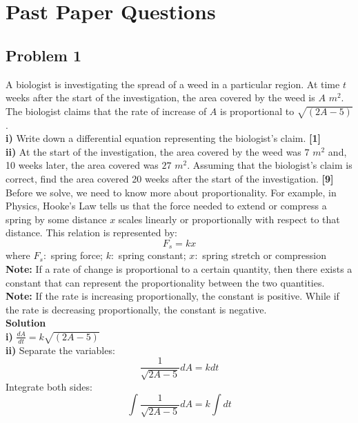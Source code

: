 \documentclass[hidelinks, a4paper, 12pt]{article}
\begin{document}
    \section{Past Paper Questions}
        \subsection{Problem 1}
            A biologist is investigating the spread of a weed in a particular region. At time $t$ weeks after the start of
            the investigation, the area covered by the weed is $A$ $m^2$. The biologist claims that the rate of increase of $A$
            is proportional to $\sqrt{(2A-5)}$.\\[\baselineskip]
            \textbf{i)} Write down a differential equation representing the biologist's claim. \textbf{[1]}\\[\baselineskip]
            \textbf{ii)} At the start of the investigation, the area covered by the weed was $7$ $m^2$ and, 10 weeks later, the
            area covered was $27$ $m^2$. Assuming that the biologist's claim is correct, find the area covered 20 weeks after the
            start of the investigation. \textbf{[9]}\\[\baselineskip]
            Before we solve, we need to know more about proportionality. For example, in Physics, Hooke's Law tells us that the force 
            needed to extend or compress a spring by some distance $x$ scales linearly or proportionally with respect to that distance.
            This relation is represented by:    
            \[F_{s} = kx\]
            where $F_{s}:$ spring force; $k:$ spring constant; $x:$ spring stretch or compression\\[\baselineskip]   
            \textbf{Note: }If a rate of change is proportional to a certain quantity, then there exists a constant that can represent
            the proportionality between the two quantities.\\[\baselineskip]
            \textbf{Note: }If the rate is increasing proportionally, the constant is positive. While if the rate is decreasing proportionally,
            the constant is negative.\\[\baselineskip]
            \textbf{Solution}\\[\baselineskip]
            \textbf{i)} $\frac{dA}{dt} = k\sqrt{(2A-5)}$\\[\baselineskip]
            \textbf{ii)} Separate the variables:
            \[\frac{1}{\sqrt{2A-5}}dA = kdt\]
            Integrate both sides:
            \begin{equation}
                \int \frac{1}{\sqrt{2A-5}}dA = k\int dt   
            \end{equation}
\end{document}
